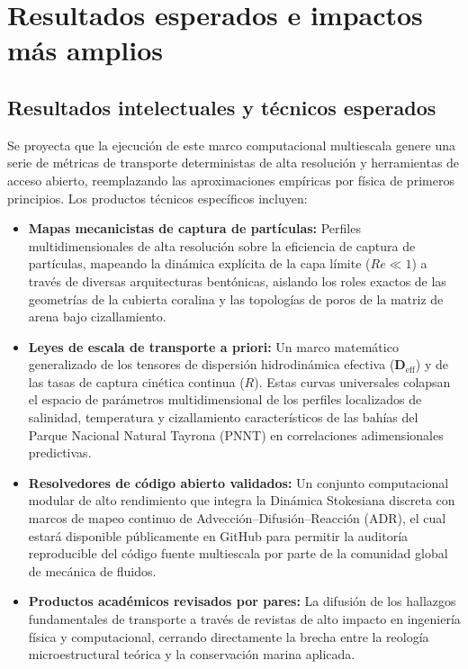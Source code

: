 \section{Resultados esperados e impactos más amplios}
\label{sec:results_impacts}

\subsection{Resultados intelectuales y técnicos esperados}
Se proyecta que la ejecución de este marco computacional multiescala genere una serie de métricas de transporte deterministas de alta resolución y herramientas de acceso abierto, reemplazando las aproximaciones empíricas por física de primeros principios. Los productos técnicos específicos incluyen:
\begin{itemize}
    \item \textbf{Mapas mecanicistas de captura de partículas:} Perfiles multidimensionales de alta resolución sobre la eficiencia de captura de partículas, mapeando la dinámica explícita de la capa límite ($Re \ll 1$) a través de diversas arquitecturas bentónicas, aislando los roles exactos de las geometrías de la cubierta coralina y las topologías de poros de la matriz de arena bajo cizallamiento.
    \item \textbf{Leyes de escala de transporte a priori:} Un marco matemático generalizado de los tensores de dispersión hidrodinámica efectiva ($\bm{D}_{\text{eff}}$) y de las tasas de captura cinética continua ($R$). Estas curvas universales colapsan el espacio de parámetros multidimensional de los perfiles localizados de salinidad, temperatura y cizallamiento característicos de las bahías del Parque Nacional Natural Tayrona (PNNT) en correlaciones adimensionales predictivas.
    \item \textbf{Resolvedores de código abierto validados:} Un conjunto computacional modular de alto rendimiento que integra la Dinámica Stokesiana discreta con marcos de mapeo continuo de Advección--Difusión--Reacción (ADR), el cual estará disponible públicamente en GitHub para permitir la auditoría reproducible del código fuente multiescala por parte de la comunidad global de mecánica de fluidos.
    \item \textbf{Productos académicos revisados por pares:} La difusión de los hallazgos fundamentales de transporte a través de revistas de alto impacto en ingeniería física y computacional, cerrando directamente la brecha entre la reología microestructural teórica y la conservación marina aplicada.
\end{itemize}

